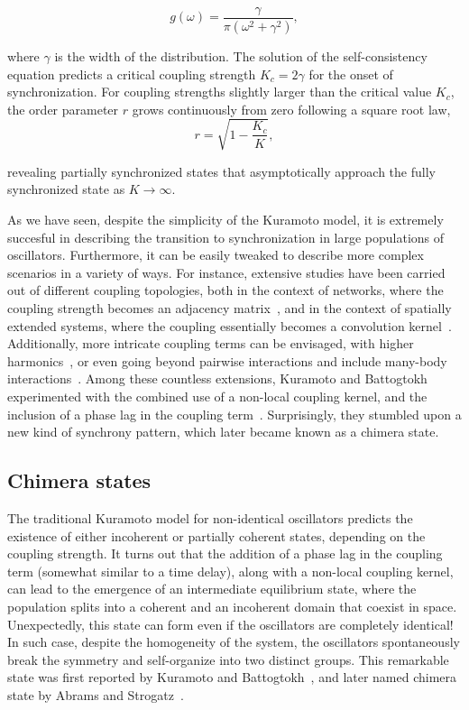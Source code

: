 \begin{equation}
    g(\omega) = \dfrac{\gamma}{\pi(\omega^2 + \gamma^2)},
\end{equation}

\noindent where $\gamma$ is the width of the distribution. The solution of the self-consistency equation
predicts a critical coupling strength $K_c = 2\gamma$ for the onset of synchronization. For
coupling strengths slightly larger than the critical value $K_c$, the order parameter 
$r$ grows continuously from zero following a square root law, 
$$r = \sqrt{1 - \frac{K_c}{K}},$$

\noindent revealing partially synchronized states that asymptotically approach the fully synchronized state
as $K\to\infty$. 

As we have seen, despite the simplicity of the Kuramoto model, it is extremely succesful
in describing the transition to synchronization in large populations of oscillators. Furthermore,
it can be easily tweaked to describe more complex scenarios in a variety of ways. For instance,
extensive studies have been carried out of different coupling topologies, both in the context
of networks, where the coupling strength becomes an adjacency matrix~\cite{rodrigues2016kuramoto},
and in the context of
spatially extended systems, where the coupling essentially becomes a convolution kernel~\cite{omelchenko2018mathematics}.
Additionally, more intricate coupling terms can be envisaged, with higher harmonics~\cite{daido1996onset}, or
even going beyond pairwise interactions and include many-body interactions~\cite{boccaletti2023structure}. Among these 
countless extensions, Kuramoto and Battogtokh experimented with the combined use of a non-local coupling
kernel, and the inclusion of a phase lag in the coupling term~\cite{kuramoto2002coexistence}. Surprisingly, they stumbled
upon a new kind of synchrony pattern, which later became known as a chimera state.

\subsection{Chimera states}

The traditional Kuramoto model for non-identical oscillators predicts 
the existence of either incoherent or partially coherent states, depending on the coupling strength.
It turns out that the addition of a phase lag
in the coupling term (somewhat similar to a time delay), along with a non-local coupling
kernel, can lead to the emergence of an intermediate equilibrium state, where the population splits 
into a coherent and an incoherent domain that coexist in space. Unexpectedly, this state can form
even if the oscillators are completely identical! In such case, despite the homogeneity of the system,
the oscillators spontaneously break the symmetry and self-organize into two distinct groups.
This remarkable state was first reported by Kuramoto and Battogtokh~\cite{kuramoto2002coexistence},
and later named chimera state by Abrams and Strogatz~\cite{abrams2004chimera}. 

